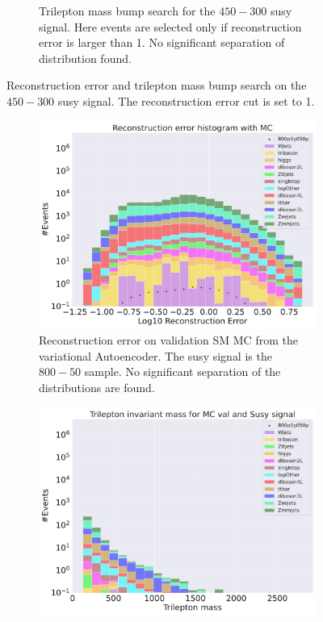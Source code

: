 \begin{figure}[h!]
\begin{subfigure}{.8\textwidth}
        \caption{Trilepton mass bump search for the $450-300$ susy signal. Here events are selected only if reconstruction error is larger than 1. No significant 
        separation of distribution found.}
        \label{fig:vae_susy_450_300_trilep}
    \end{subfigure}
    \hfill        
    \caption{ Reconstruction error and trilepton mass bump search on the $450-300$ susy signal. The reconstruction error cut is set to 1.}
    \label{fig:vae_susy_450_300_recon_trilep}
\end{figure}


\begin{figure}[h!]
    \centering
    \begin{subfigure}{.8\textwidth}
        \includegraphics[width=\textwidth]{Figures/VAE_testing/small/b_data_recon_big_rm3_feats_sig_800p0p050p.pdf}
        \caption{Reconstruction error on validation SM MC from the variational Autoencoder. The susy signal is the $800-50$ sample. 
        No significant separation of the distributions are found. }
        \label{fig:vae_susy_800_50_recon}
    \end{subfigure}
    \hfill
    \begin{subfigure}{.8\textwidth}
        \includegraphics[width=\textwidth]{Figures/VAE_testing/small/b_data_recon_big_rm3_feats_sig_800p0p050p_Trilepton mass.pdf}

\end{subfigure}
\end{figure}
